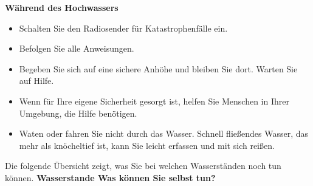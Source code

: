 \textnormal{\newline\bfseries Während des Hochwassers}
\begin{itemize}   
  \item  Schalten Sie den Radiosender für Katastrophenfälle ein.
   \item Befolgen Sie alle Anweisungen.
  \item  Begeben Sie sich auf eine sichere Anhöhe und bleiben Sie dort. Warten Sie auf Hilfe.
 \item   Wenn für Ihre eigene Sicherheit gesorgt ist, helfen Sie Menschen in Ihrer Umgebung, die Hilfe benötigen.
  \item  Waten oder fahren Sie nicht durch das Wasser. Schnell fließendes Wasser, das mehr als knöcheltief ist, kann Sie leicht erfassen und mit sich reißen.
\end{itemize}   
\textnormal{Die folgende Übersicht zeigt, was Sie bei welchen 
Wasserständen noch tun können.}
\newline
\textnormal{\newline\bfseries Wasserstande Was können Sie selbst tun?}
\newline
